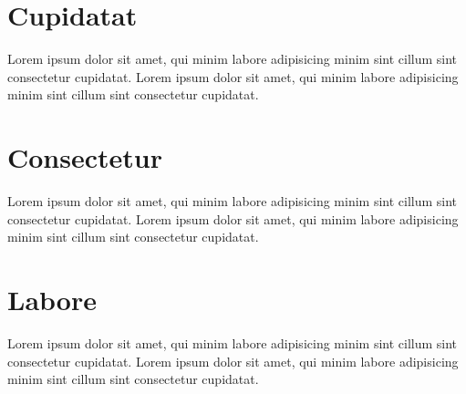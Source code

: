 \section{Cupidatat}
Lorem ipsum dolor sit amet, qui minim labore adipisicing minim sint cillum sint consectetur cupidatat. Lorem ipsum dolor sit amet, qui minim labore adipisicing minim sint cillum sint consectetur cupidatat.

\section{Consectetur}
Lorem ipsum dolor sit amet, qui minim labore adipisicing minim sint cillum sint consectetur cupidatat. Lorem ipsum dolor sit amet, qui minim labore adipisicing minim sint cillum sint consectetur cupidatat.

\section{Labore}
Lorem ipsum dolor sit amet, qui minim labore adipisicing minim sint cillum sint consectetur cupidatat. Lorem ipsum dolor sit amet, qui minim labore adipisicing minim sint cillum sint consectetur cupidatat.

